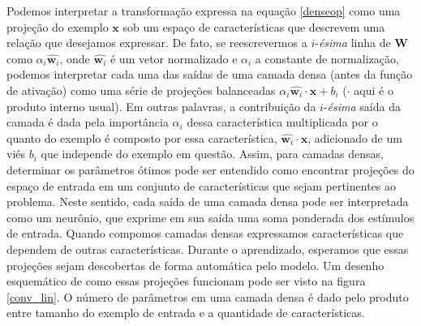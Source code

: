 Podemos interpretar a transformação expressa na equação \ref{denseop} como uma projeção do exemplo $\mathbf{x}$ sob um espaço de características que descrevem uma relação que desejamos expressar. De fato, se reescrevermos a $i$-\textit{ésima} linha de $\mathbf{W}$ como $\alpha_i \hat{\mathbf{w}_i}$, onde $\hat{\mathbf{w}_i}$ é um vetor normalizado e $\alpha_i$ a constante de normalização, podemos interpretar cada uma das saídas de uma camada densa (antes da função de ativação) como uma série de projeções balanceadas $\alpha_i \hat{\mathbf{w}_i} \cdot \mathbf{x} + b_i$ ($\cdot$ aqui é o produto interno usual). Em outras palavras, a contribuição da $i$-\textit{ésima} saída da camada é dada pela importância $\alpha_i$ dessa característica multiplicada por o quanto do exemplo é composto por essa característica,  $\hat{\mathbf{w}_i} \cdot \mathbf{x}$, adicionado de um viés $b_i$ que independe do exemplo em questão. Assim, para camadas densas, determinar os parâmetros ótimos pode ser entendido como encontrar projeções do espaço de entrada em um conjunto de características que sejam pertinentes ao problema. Neste sentido, cada saída de uma camada densa pode ser interpretada como um neurônio, que exprime em sua saída uma soma ponderada dos estímulos de entrada. Quando compomos camadas densas expressamos características que dependem de outras características. Durante o aprendizado, esperamos que essas projeções sejam descobertas de forma automática pelo modelo. Um desenho esquemático de como essas projeções funcionam pode ser visto na figura \ref{conv_lin}. O número de parâmetros em uma camada densa é dado pelo produto entre tamanho do exemplo de entrada e a quantidade de características.

